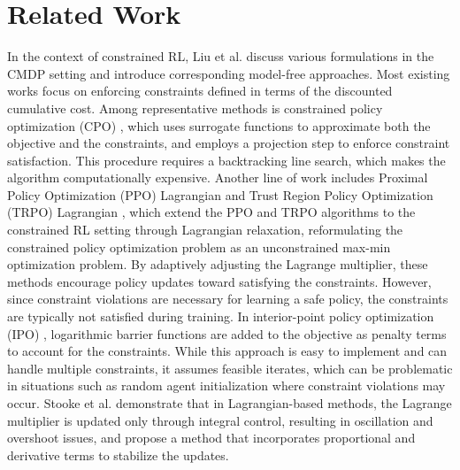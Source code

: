 \section{Related Work}

In the context of constrained RL, Liu et al. \cite{liu2021policy} discuss various formulations in the CMDP setting and introduce corresponding model-free approaches.
Most existing works focus on enforcing constraints defined in terms of the discounted cumulative cost.
Among representative methods is constrained policy optimization (CPO) \cite{achiam2017constrained}, which uses surrogate functions to approximate both the objective and the constraints, and employs a projection step to enforce constraint satisfaction.
This procedure requires a backtracking line search, which makes the algorithm computationally expensive.
Another line of work includes Proximal Policy Optimization (PPO) Lagrangian and Trust Region Policy Optimization (TRPO) Lagrangian \cite{ray2019benchmarking}, which extend the PPO \cite{schulman2017proximal} and TRPO \cite{schulman2015trust} algorithms to the constrained RL setting through Lagrangian relaxation, reformulating the constrained policy optimization problem as an unconstrained max-min optimization problem.
By adaptively adjusting the Lagrange multiplier, these methods encourage policy updates toward satisfying the constraints.
However, since constraint violations are necessary for learning a safe policy, the constraints are typically not satisfied during training.
In interior-point policy optimization (IPO) \cite{liu2020ipo}, logarithmic barrier functions are added to the objective as penalty terms to account for the constraints.
While this approach is easy to implement and can handle multiple constraints, it assumes feasible iterates, which can be problematic in situations such as random agent initialization where constraint violations may occur.
Stooke et al. \cite{stooke2020responsive} demonstrate that in Lagrangian-based methods, the Lagrange multiplier is updated only through integral control, resulting in oscillation and overshoot issues, and propose a method that incorporates proportional and derivative terms to stabilize the updates.